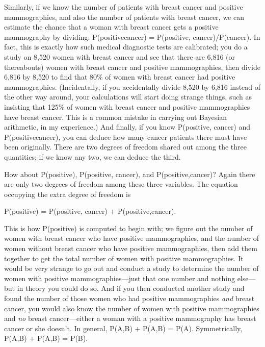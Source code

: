 {
 Similarly, if we know the number of patients with breast cancer
and positive mammographies, and also the number of patients with breast
cancer, we can estimate the chance that a woman with breast cancer gets
a positive mammography by dividing: P(positive{\textbar}cancer) =
P(positive, cancer)$/$P(cancer). In fact, this is exactly how such
medical diagnostic tests are calibrated; you do a study on 8,520 women
with breast cancer and see that there are 6,816 (or thereabouts) women
with breast cancer and positive mammographies, then divide 6,816 by
8,520 to find that 80\% of women with breast cancer had positive
mammographies. (Incidentally, if you accidentally divide 8,520 by 6,816
instead of the other way around, your calculations will start doing
strange things, such as insisting that 125\% of women with breast
cancer and positive mammographies have breast cancer. This is a common
mistake in carrying out Bayesian arithmetic, in my experience.) And
finally, if you know P(positive, cancer) and
P(positive{\textbar}cancer), you can deduce how many cancer patients
there must have been originally. There are two degrees of freedom
shared out among the three quantities; if we know any two, we can
deduce the third.}

{
 How about P(positive), P(positive, cancer), and
P(positive,{\textlnot}cancer)? Again there are only two degrees of
freedom among these three variables. The equation occupying the extra
degree of freedom is}

{\centering
 P(positive) = P(positive, cancer) + P(positive,{\textlnot}cancer).
\par}


\bigskip

{
 This is how P(positive) is computed to begin with; we figure out
the number of women with breast cancer who have positive mammographies,
and the number of women without breast cancer who have positive
mammographies, then add them together to get the total number of women
with positive mammographies. It would be very strange to go out and
conduct a study to determine the number of women with positive
mammographies---just that one number and nothing else---but in theory
you could do so. And if you then conducted another study and found the
number of those women who had positive mammographies \textit{and}
breast cancer, you would also know the number of women with positive
mammographies and \textit{no} breast cancer---either a woman with a
positive mammography has breast cancer or she doesn't.
In general, P(A,B) + P(A,{\textlnot}B) = P(A). Symmetrically, P(A,B) +
P({\textlnot}A,B) = P(B).}

